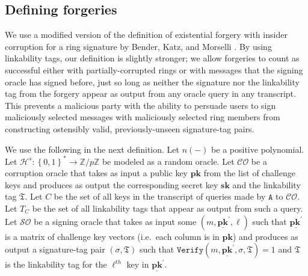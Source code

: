 \documentclass{mrl}
\theoremstyle{plain}
\theoremstyle{definition}
\begin{document}
\subsection{Defining forgeries}
We use a modified version of the definition of existential forgery with insider corruption for a ring signature by Bender, Katz, and Morselli \cite{bender}. By using linkability tags, our definition is slightly stronger; we allow forgeries to count as successful either with partially-corrupted rings or with messages that the signing oracle has signed before, just so long as neither the signature nor the linkability tag from the forgery appear as output from any oracle query in any transcript. This prevents a malicious party with the ability to persuade users to sign maliciously selected messages with maliciously selected ring members from constructing ostensibly valid, previously-unseen signature-tag pairs.

We use the following in the next definition. Let $n(-)$ be a positive polynomial. Let $\mathcal{H}^s:\left\{0,1\right\}^* \to \mathbb{Z}/p\mathbb{Z}$ be modeled as a random oracle. Let $\mathcal{CO}$ be a corruption oracle that takes as input a public key $\textbf{pk}$ from the list of challenge keys and produces as output the corresponding secret key $\textbf{sk}$ and the linkability tag $\mathfrak{T}$. Let $C$ be the set of all keys in the transcript of queries made by $\texttt{A}$ to $\mathcal{CO}$. Let $T_C$ be the set of all linkability tags that appear as output from such a query. Let $\mathcal{SO}$ be a signing oracle that takes as input some $(m, \underline{\textbf{pk}}^\prime, \ell)$ such that $\underline{\textbf{pk}^\prime}$ is a matrix of challenge key vectors (i.e.\ each column is in $\textbf{pk}$) and produces as output a signature-tag pair $(\sigma, \mathfrak{T})$ such that $\texttt{Verify}(m, \underline{\textbf{pk}}^\prime, \sigma, \mathfrak{T}) = 1$ and $\mathfrak{T}$ is the linkability tag for the $\ell^{th}$ key in $\underline{\textbf{pk}}^\prime$.
\end{document}
